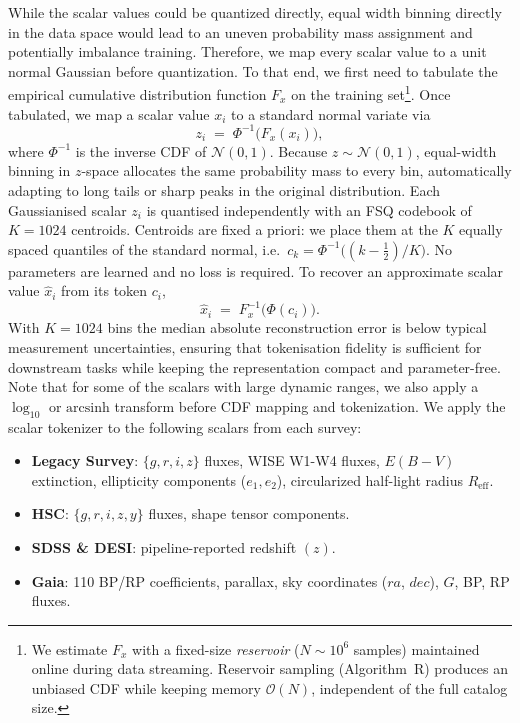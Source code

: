 \documentclass[]{polymathic}
\begin{document}
While the scalar values could be quantized directly, equal width binning directly in the data space would lead to an uneven probability mass assignment and potentially imbalance training. Therefore, we map every scalar value to a unit normal Gaussian before quantization. To that end, we first need to tabulate the empirical cumulative distribution function \(F_x\) on the training set\footnote{We estimate \(F_x\) with a fixed-size \emph{reservoir} (\(N\sim10^{6}\) samples) maintained online during data streaming. 
Reservoir sampling (Algorithm~R) produces an unbiased CDF while keeping memory \(\mathcal{O}(N)\), independent of the full catalog size.}. Once tabulated, we map a scalar value \(x_i\) to a standard normal variate via
\begin{equation}
    z_i \;=\; \Phi^{-1}\!\bigl(F_x(x_i)\bigr),
    \label{eq:scalar_gauss}
\end{equation}
where \(\Phi^{-1}\) is the inverse CDF of \(\mathcal{N}(0,1)\). Because \(z\sim\mathcal{N}(0,1)\), equal-width binning in \(z\)-space allocates the same probability mass to every bin, automatically adapting to long tails or sharp peaks in the original distribution. Each Gaussianised scalar \(z_i\) is quantised independently with an FSQ codebook of \(K=1024\) centroids. Centroids are fixed a priori: we place them at the \(K\) equally spaced quantiles of the standard normal, i.e.\ \(c_k = \Phi^{-1}\!\bigl((k-\tfrac12)/K\bigr)\).  
No parameters are learned and no loss is required. To recover an approximate scalar value \(\hat{x}_i\) from its token \(c_i\),
\[
    \hat{x}_i \;=\; F_x^{-1}\!\bigl(\Phi(c_i)\bigr).
\]
With \(K=1024\) bins the median absolute reconstruction error is below typical measurement uncertainties, ensuring that tokenisation fidelity is sufficient for downstream tasks while keeping the representation compact and parameter-free. Note that for some of the scalars with large dynamic ranges, we also apply a $\log_{10}$ or $\mathrm{arcsinh}$ transform before CDF mapping and tokenization. We apply the scalar tokenizer to the following scalars from each survey:

\begin{itemize}
    \item \textbf{Legacy Survey}: $\{g,r,i,z\}$ fluxes, WISE W1-W4 fluxes, $E(B-V)$ extinction, ellipticity components ($e_1,e_2$), circularized half-light radius $R_{\textrm{eff}}$.
    \item \textbf{HSC}: $\{g,r,i,z,y\}$ fluxes, shape tensor components.
    \item \textbf{SDSS \& DESI}: pipeline-reported redshift $(z)$.
    \item \textbf{Gaia}: 110 BP/RP coefficients, parallax, sky coordinates ($ra$, $dec$), $G$, BP, RP fluxes.
\end{itemize}
\end{document}
